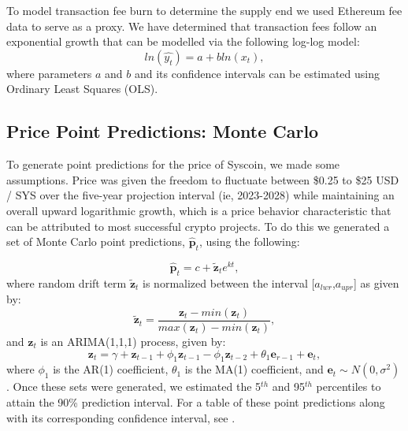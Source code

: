 \documentclass[journal,twocolumn,12pt]{ieeesyscoin}
\begin{document}
To model transaction fee burn to determine the supply end we used Ethereum fee data to serve as a proxy. We have determined that transaction fees follow an exponential growth that can be modelled via the following log-log model:
\begin{equation}
ln(\hat{y_{t}}) = a + bln(x_{t}),
\end{equation}
where parameters $a$ and $b$ and its confidence intervals can be estimated using Ordinary Least Squares (OLS).

\subsection{Price Point Predictions: Monte Carlo}
\label{appendix:monte_carlo}
To generate point predictions for the price of Syscoin, we made some assumptions. Price was given the freedom to fluctuate between \$0.25 to \$25 USD / SYS over the five-year projection interval (ie, 2023-2028) while maintaining an overall upward logarithmic growth, which is a price behavior characteristic that can be attributed to most successful crypto projects. To do this we generated a set of Monte Carlo point predictions, $\mathbf{\hat{p}}_{t}$, using the following:

\begin{equation}
\label{eqn:trend}
	\mathbf{\hat{p}}_{t} = c + \mathbf{\tilde{z}}_{t}e^{kt},
\end{equation}
where random drift term $\mathbf{\tilde{z}}_{t}$ is normalized between the interval [$a_{lwr}$,$a_{upr}$] as given by:
\begin{equation}
\label{eqn:min_max}
	\mathbf{\tilde{z}}_{t}= \frac{\mathbf{z}_{t} - min(\mathbf{z}_{t})}{max(\mathbf{z}_{t}) - min(\mathbf{z}_{t})},
\end{equation}
and $\mathbf{z}_{t}$ is an ARIMA(1,1,1) process, given by:
\begin{equation}
\label{eqn:drift}
	\mathbf{z}_{t} = \gamma + \mathbf{z}_{t-1} + \phi_{1} \mathbf{z}_{t-1} - \phi_{1} \mathbf{z}_{t-2} +  \theta_{1} \mathbf{e}_{r-1} + \mathbf{e}_{t},
\end{equation}
where $\phi_{1}$ is the AR(1) coefficient, $\theta_{1}$ is the MA(1) coefficient, and $\mathbf{e}_{t} \sim N(0, \sigma^2)$. Once these sets were generated, we estimated the 5$^{th}$ and 95$^{th}$ percentiles to attain the 90\% prediction interval. For a table of these point predictions along with its corresponding confidence interval, see \cite{Moo22A}. 
\end{document}

